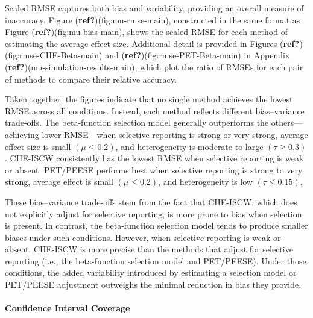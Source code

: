 \documentclass[
]{article}
\begin{document}
Scaled RMSE captures both bias and variability, providing an overall
measure of inaccuracy. Figure (\textbf{ref?})(fig:mu-rmse-main),
constructed in the same format as Figure
(\textbf{ref?})(fig:mu-bias-main), shows the scaled RMSE for each method
of estimating the average effect size. Additional detail is provided in
Figures (\textbf{ref?})(fig:rmse-CHE-Beta-main) and
(\textbf{ref?})(fig:rmse-PET-Beta-main) in Appendix
(\textbf{ref?})(mu-simulation-results-main), which plot the ratio of
RMSEs for each pair of methods to compare their relative accuracy.

Taken together, the figures indicate that no single method achieves the
lowest RMSE across all conditions. Instead, each method reflects
different bias--variance trade-offs. The beta-function selection model
generally outperforms the others---achieving lower RMSE---when selective
reporting is strong or very strong, average effect size is small
\((\mu \leq 0.2)\), and heterogeneity is moderate to large
\((\tau \geq 0.3)\). CHE-ISCW consistently has the lowest RMSE when
selective reporting is weak or absent. PET/PEESE performs best when
selective reporting is strong to very strong, average effect is small
\((\mu \leq 0.2)\), and heterogeneity is low \((\tau \leq 0.15)\).

These bias--variance trade-offs stem from the fact that CHE-ISCW, which
does not explicitly adjust for selective reporting, is more prone to
bias when selection is present. In contrast, the beta-function selection
model tends to produce smaller biases under such conditions. However,
when selective reporting is weak or absent, CHE-ISCW is more precise
than the methods that adjust for selective reporting (i.e., the
beta-function selection model and PET/PEESE). Under those conditions,
the added variability introduced by estimating a selection model or
PET/PEESE adjustment outweighs the minimal reduction in bias they
provide.

\paragraph{Confidence Interval
Coverage}\label{confidence-interval-coverage}
\end{document}

